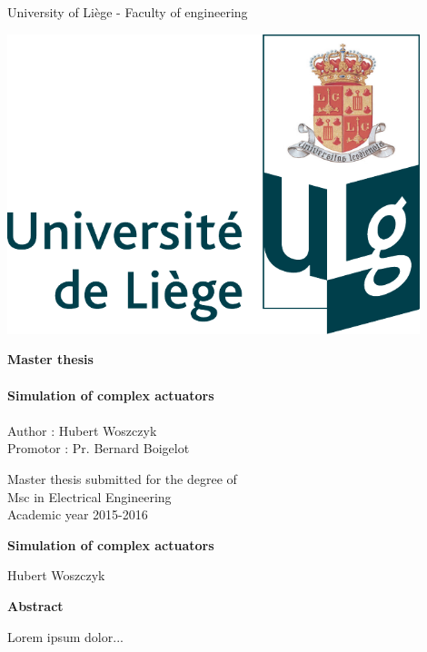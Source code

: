 \begin{titlepage}


\begin{center}
\large
University of Liège - Faculty of engineering
\end{center}

\vfill

\begin{minipage}{0.5\textwidth}
\includegraphics[width=0.9\textwidth]{figures/ULg_logo_couleur.pdf}
\end{minipage}
\begin{minipage}{0.5\textwidth}
\huge
\textbf{Master thesis}\\\\
\normalsize
\textbf{Simulation of complex actuators}\\\\
Author : Hubert Woszczyk\\
Promotor : Pr. Bernard Boigelot\\
\end{minipage}

\vfill
\begin{center}
\large
Master thesis submitted for the degree of\\ 
Msc in Electrical Engineering\\
\vspace*{8cm}
\normalsize
Academic year 2015-2016
\end{center}

\end{titlepage}

\newpage\null\thispagestyle{empty}\newpage

\thispagestyle{empty}
\begin{center}
    \Large
    \textbf{Simulation of complex actuators}
        
    \vspace{0.4cm}
    \large
    Hubert Woszczyk
    \normalsize
    
    \vspace{0.9cm}
    \textbf{Abstract}
\end{center}
Lorem ipsum dolor...


